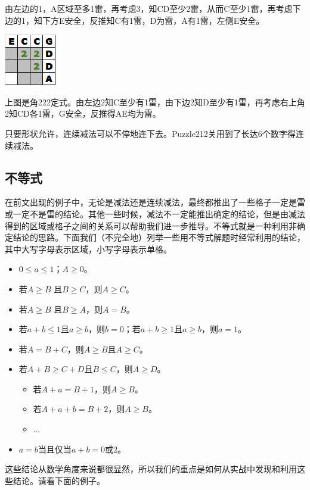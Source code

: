 由左边的1，A区域至多1雷，再考虑3，知CD至少2雷，从而C至少1雷，再考虑下边的1，知下方E安全，反推知C有1雷，D为雷，A有1雷，左侧E安全。

\vspace{5mm}
\begin{center}
    \includegraphics{trick/减法6.png}
\end{center}
上图是角222定式。由左边2知C至少有1雷，由下边2知D至少有1雷，再考虑右上角2知CD各1雷，G安全，反推得AE均为雷。

只要形状允许，连续减法可以不停地连下去。Puzzle212关用到了长达6个数字得连续减法。

\subsection{不等式}
在前文出现的例子中，无论是减法还是连续减法，最终都推出了一些格子一定是雷或一定不是雷的结论。其他一些时候，减法不一定能推出确定的结论，但是由减法得到的区域或格子之间的关系可以帮助我们进一步推导。不等式就是一种利用非确定结论的思路。下面我们（不完全地）列举一些用不等式解题时经常利用的结论，其中大写字母表示区域，小写字母表示单格。

\begin{itemize}
    \item $0\le a\le 1$；$A\ge 0$。
    \item 若$A\ge B$ 且$B\ge C$，则$A\ge C$。
    \item 若$A\ge B$ 且$B\ge A$，则$A=B$。
    \item 若$a+b\le 1$且$a\ge b$，则$b=0$；若$a+b\ge 1$且$a\ge b$，则$a=1$。
    \item 若$A=B+C$，则$A\ge B$且$A\ge C$。
    \item 若$A+B\ge C+D$且$B\le C$，则$A\ge D$。
    \begin{itemize}
        \item 若$A+a=B+1$，则$A\ge B$。
        \item 若$A+a+b=B+2$，则$A\ge B$。
        \item $\dots$
    \end{itemize}
	\item $a=b$当且仅当$a+b=0$或$2$。
\end{itemize}

这些结论从数学角度来说都很显然，所以我们的重点是如何从实战中发现和利用这些结论。请看下面的例子。

